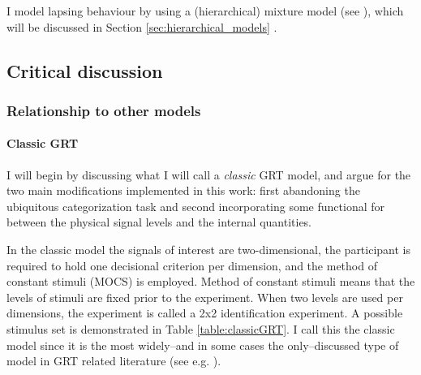 \documentclass{article}\usepackage{knitr}
\begin{document}
I model lapsing behaviour by using a (hierarchical) mixture model (see \citet{zeigenfuse2010}), which will be discussed in Section \ref{sec:hierarchical_models} \textit{}.



\subsection{Critical discussion}
\label{sec:grt_criticism}

\subsubsection{Relationship to other models}

\paragraph{Classic GRT}

I will begin by discussing what I will call a \textit{classic} GRT model, and argue for the two main modifications implemented in this work: first abandoning the ubiquitous categorization task and second incorporating some functional for between the physical signal levels and the internal quantities. 

In the classic model the signals of interest are two-dimensional, the participant is required to hold one decisional criterion per dimension, and the method of constant stimuli (MOCS) is employed. Method of constant stimuli means that the levels of stimuli are fixed prior to the experiment. When two levels are used per dimensions, the experiment is called a 2x2 identification experiment.  A possible stimulus set is demonstrated in Table \ref{table:classicGRT}. I call this the classic model since it is the most widely--and in some cases the only--discussed type of model in GRT related literature (see e.g. \cite{ashby2015, ashby1986, cohen2003, kadlec1992, silbert2010, silbert2013}). 
\end{document}
